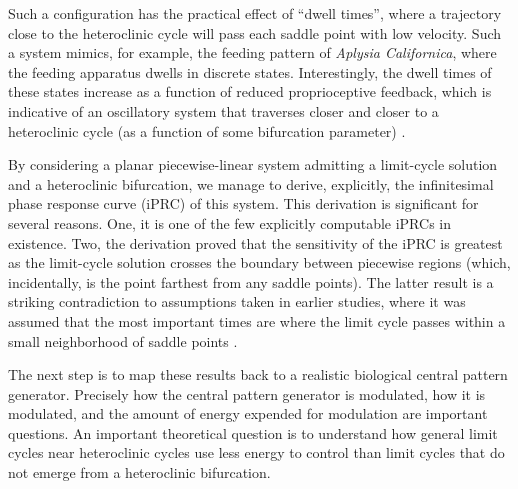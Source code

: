 \documentclass[a4paper,11pt]{article}
\begin{document}
Such a configuration has the practical effect of ``dwell times'', where a trajectory close to the heteroclinic cycle will pass each saddle point with low velocity. Such a system mimics, for example, the feeding pattern of \textit{Aplysia Californica}, where the feeding apparatus dwells in discrete states. Interestingly, the dwell times of these states increase as a function of reduced proprioceptive feedback, which is indicative of an oscillatory system that traverses closer and closer to a heteroclinic cycle (as a function of some bifurcation parameter) \cite{shaw2010evidence}.

By considering a planar piecewise-linear system admitting a limit-cycle solution and a heteroclinic bifurcation, we manage to derive, explicitly, the infinitesimal phase response curve (iPRC) of this system. This derivation is significant for several reasons. One, it is one of the few explicitly computable iPRCs in existence. Two, the derivation proved that the sensitivity of the iPRC is greatest as the limit-cycle solution crosses the boundary between piecewise regions (which, incidentally, is the point farthest from any saddle points). The latter result is a striking contradiction to assumptions taken in earlier studies, where it was assumed that the most important times are where the limit cycle passes within a small neighborhood of saddle points \cite{brown2004phase}.

The next step is to map these results back to a realistic biological central pattern generator. Precisely how the central pattern generator is modulated, how it is modulated, and the amount of energy expended for modulation are important questions. An important theoretical question is to understand how general limit cycles near heteroclinic cycles use less energy to control than limit cycles that do not emerge from a heteroclinic bifurcation.




\end{document}
